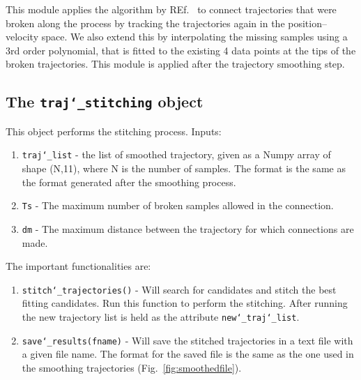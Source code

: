\documentclass[10pt,a4paper]{article}
\begin{document}
This module applies the algorithm by REf.~\cite{Xu2008} to connect trajectories that were broken along the process by tracking the trajectories again in the position--velocity space. We also extend this by interpolating the missing samples using a 3rd order polynomial, that is fitted to the existing 4 data points at the tips of the broken trajectories. This module is applied after the trajectory smoothing step.




\subsection{The \texttt{traj\char`_stitching} object}

This object performs the stitching process. Inputs:

\begin{enumerate}
	\item \texttt{traj\char`_list} - the list of smoothed trajectory, given as a Numpy array of shape (N,11), where N is the number of samples. The format is the same as the format generated after the smoothing process.
	\item \texttt{Ts} - The maximum number of broken samples allowed in the connection.
	\item \texttt{dm} - The maximum distance between the trajectory for which connections are made.
\end{enumerate}



The important functionalities are:

\begin{enumerate}
	\item \texttt{stitch\char`_trajectories()} - Will search for candidates and stitch the best fitting candidates. Run this function to perform the stitching. After running the new trajectory list is held as the attribute \texttt{new\char`_traj\char`_list}.
	
	\item \texttt{save\char`_results(fname)} - Will save the stitched trajectories in a text file with a given file name. The format for the saved file is the same as the one used in the smoothing trajectories (Fig.~\ref{fig:smoothedfile}).
\end{enumerate}







\end{document}
